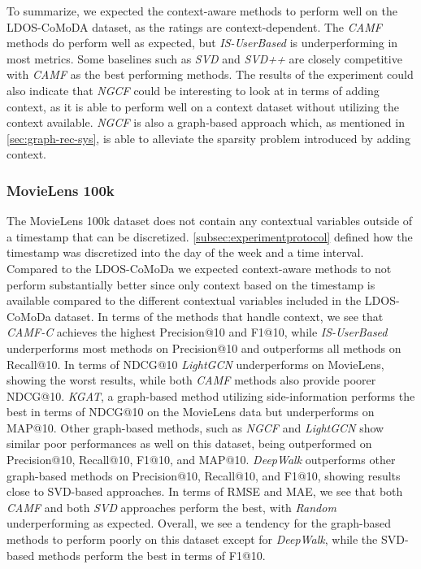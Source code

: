 To summarize, we expected the context-aware methods to perform well on the LDOS-CoMoDA dataset, as the ratings are context-dependent. 
The \textit{CAMF} methods do perform well as expected, but \textit{IS-UserBased} is underperforming in most metrics.
Some baselines such as \textit{SVD} and \textit{SVD++} are closely competitive with \textit{CAMF} as the best performing methods.
The results of the experiment could also indicate that \textit{NGCF} could be interesting to look at in terms of adding context, as it is able to perform well on a context dataset without utilizing the context available. 
\textit{NGCF} is also a graph-based approach which, as mentioned in \autoref{sec:graph-rec-sys}, is able to alleviate the sparsity problem introduced by adding context.

\subsubsection{MovieLens 100k}
The MovieLens 100k dataset does not contain any contextual variables outside of a timestamp that can be discretized.
\autoref{subsec:experimentprotocol} defined how the timestamp was discretized into the day of the week and a time interval.
Compared to the LDOS-CoMoDa we expected context-aware methods to not perform substantially better since only context based on the timestamp is available compared to the different contextual variables included in the LDOS-CoMoDa dataset. 
In terms of the methods that handle context, we see that \textit{CAMF-C} achieves the highest Precision@10 and F1@10, while \textit{IS-UserBased} underperforms most methods on Precision@10 and outperforms all methods on Recall@10.
In terms of NDCG@10 \textit{LightGCN} underperforms on MovieLens, showing the worst results, while both \textit{CAMF} methods also provide poorer NDCG@10.
\textit{KGAT}, a graph-based method utilizing side-information performs the best in terms of NDCG@10 on the MovieLens data but underperforms on MAP@10.
Other graph-based methods, such as \textit{NGCF} and \textit{LightGCN} show similar poor performances as well on this dataset, being outperformed on Precision@10, Recall@10, F1@10, and MAP@10.
\textit{DeepWalk} outperforms other graph-based methods on Precision@10, Recall@10, and F1@10, showing results close to SVD-based approaches.
In terms of RMSE and MAE, we see that both \textit{CAMF} and both \textit{SVD} approaches perform the best, with \textit{Random} underperforming as expected.
Overall, we see a tendency for the graph-based methods to perform poorly on this dataset except for \textit{DeepWalk}, while the SVD-based methods perform the best in terms of F1@10.

